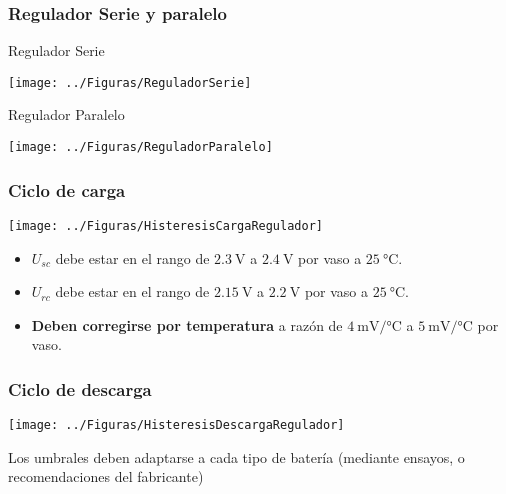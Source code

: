 \documentclass[serif, xcolor=dvipsnames]{beamer}
\begin{document}
\begin{frame}
\frametitle{Regulador Serie y paralelo}
\begin{block}
{Regulador Serie}

\begin{center}
\texttt{[image: ../Figuras/ReguladorSerie]}
\par\end{center}

\end{block}
{}
\begin{block}
{Regulador Paralelo}

\begin{center}
\texttt{[image: ../Figuras/ReguladorParalelo]}
\par\end{center}

\end{block}

\end{frame}

\begin{frame}[plain]
\frametitle{Ciclo de carga}

\begin{center}
\texttt{[image: ../Figuras/HisteresisCargaRegulador]}
\par\end{center}
\begin{itemize}
\item $U_{sc}$ debe estar en el rango de $\SI{2.3}{\volt}$ a $\SI{2.4}{\volt}$
por vaso a $\SI{25}{\celsius}$. 
\item $U_{rc}$ debe estar en el rango de $\SI{2.15}{\volt}$ a $\SI{2.2}{\volt}$
por vaso a $\SI{25}{\celsius}$. 
\item \textbf{Deben corregirse por temperatura} a razón de $\SI{4}{\milli\volt\per\celsius}$
a $\SI{5}{\milli\volt\per\celsius}$ por vaso.
\end{itemize}

\end{frame}

\begin{frame}[plain]
\frametitle{Ciclo de descarga}

\begin{center}
\texttt{[image: ../Figuras/HisteresisDescargaRegulador]}
\par\end{center}

Los umbrales deben adaptarse a cada tipo de batería (mediante ensayos,
o recomendaciones del fabricante)


\end{frame}
\end{document}
